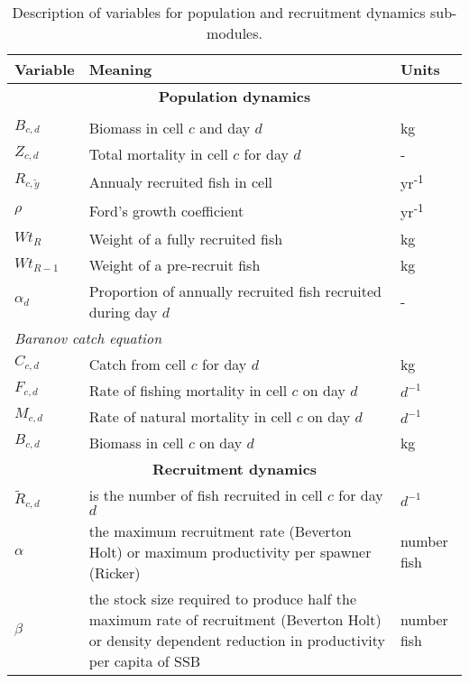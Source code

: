 
\begin{table}[!ht]
	\centering
	\caption{Description of variables for population and recruitment
		dynamics sub-modules.}
	\label{tab: pop_variable}
	\begin{tabular}{p{1.5cm} p{8cm} p{1.5cm}}
		\toprule
		Variable & Meaning & Units \\
		\hline
		\multicolumn{3}{c}{\textbf{Population dynamics}}  \\
		\hhline{===}
		\multicolumn{3}{l}{\textit{Delay-difference model}} \\
		\hline
		$B_{c,d}$ & Biomass in cell $c$ and day $d$ & kg \\
		$Z_{c,d}$ & Total mortality in cell $c$ for day $d$ & - \\
		$R_{c, \tilde{y}}$  &Annualy recruited fish in cell &  yr\textsuperscript{-1} \\
		$\rho$ & Ford's growth coefficient & yr\textsuperscript{-1} \\
		$Wt_{R}$ & Weight of a fully recruited fish & kg \\
		$Wt_{R-1}$ & Weight of a pre-recruit fish & kg \\
		$\alpha_{d}$ & Proportion of annually recruited fish recruited
		during day $d$ & - \\
		\hline
		\multicolumn{3}{l}{\textit{Baranov catch equation}} \\
		\hline
		$C_{c,d}$ & Catch from cell $c$ for day $d$ & kg \\
		$F_{c,d}$ & Rate of fishing mortality in cell $c$
		on day $d$ & $d^{-1}$ \\
		$M_{c,d}$ & Rate of natural mortality in cell $c$
		on day $d$ & $d^{-1}$ \\
		$B_{c,d}$ & Biomass in cell $c$ on day $d$ & kg \\
		\hline
		\multicolumn{3}{c}{\textbf{Recruitment dynamics}} \\
		\hhline{===}
		$\tilde{R}_{c,d}$ & is the number of fish recruited in cell $c$ for day $d$ & $d^{-1}$ \\
		$\alpha$ & the maximum recruitment rate (Beverton Holt)
		or maximum productivity per spawner (Ricker) & number fish  \\
		$\beta$ & the stock size required to produce half the maximum rate
		of recruitment (Beverton Holt) or density dependent reduction
		in productivity per capita of SSB & number fish \\
		\bottomrule
		\end{tabular}
\end{table}

